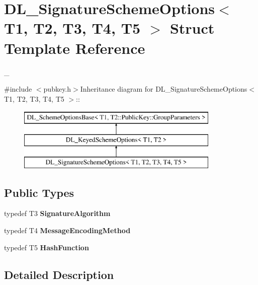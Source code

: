 \hypertarget{struct_d_l___signature_scheme_options}{
\section{DL\_\-SignatureSchemeOptions$<$ T1, T2, T3, T4, T5 $>$ Struct Template Reference}
\label{struct_d_l___signature_scheme_options}
}


\_\-  


{\ttfamily \#include $<$pubkey.h$>$}Inheritance diagram for DL\_\-SignatureSchemeOptions$<$ T1, T2, T3, T4, T5 $>$::\begin{figure}[H]
\begin{center}
\leavevmode
\includegraphics[height=3cm]{struct_d_l___signature_scheme_options}
\end{center}
\end{figure}
\subsection*{Public Types}
\begin{DoxyCompactItemize}
\item 
\hypertarget{struct_d_l___signature_scheme_options_afd69b8fbee07d0d29f21b6aefb300572}{
typedef T3 {\bfseries SignatureAlgorithm}}
\label{struct_d_l___signature_scheme_options_afd69b8fbee07d0d29f21b6aefb300572}

\item 
\hypertarget{struct_d_l___signature_scheme_options_ac8255c90d7d11107984646ea0ac48468}{
typedef T4 {\bfseries MessageEncodingMethod}}
\label{struct_d_l___signature_scheme_options_ac8255c90d7d11107984646ea0ac48468}

\item 
\hypertarget{struct_d_l___signature_scheme_options_a2cc03c0aa9d2155df8b3455e3b50da54}{
typedef T5 {\bfseries HashFunction}}
\label{struct_d_l___signature_scheme_options_a2cc03c0aa9d2155df8b3455e3b50da54}

\end{DoxyCompactItemize}


\subsection{Detailed Description}
